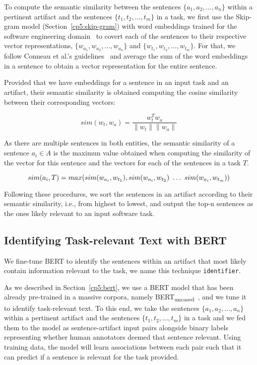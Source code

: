 To compute the semantic similarity between the sentences $\{a_1, a_2, \dots, a_n\}$ within a pertinent artifact and the sentences $\{t_1, t_2, \dots, t_m\}$ in a task,
we first
 use the Skip-gram model (Section~\ref{cp5:skip-gram}) with word embeddings trained for the software engineering domain~\cite{Efstathiou2018} to covert each of the sentences to their respective vector representations, $\{ w_{a_1}, w_{a_2}, \dots, w_{a_n}\}$ and $\{ w_{t_1}, w_{t_2}, \dots, w_{t_m}\}$. For that, we follow Conneau et al.'s guidelines~\cite{conneau2018} 
 and average the sum of the word embeddings in a sentence to obtain a vector representation for the entire sentence.

 
 Provided that we have embeddings for a sentence in an input task and an artifact, their semantic similarity is obtained computing the cosine similarity  between their corresponding vectors:


\begin{equation}
    sim(w_t,w_a) = \frac{w_t^Tw_a}{\|w_t\| \|w_a\|}
    \label{eq:word-sim}
\end{equation}
 
\smallskip
 As there are multiple sentences in both entities, the semantic similarity of a sentence $a_i \in A$ is the maximun value obtained when computing the similarity of the vector for this sentence and the vectors for each of the sentences in a task $T$.

 \begin{equation}
    sim(a_i, T) = max(sim(w_{a_i}, w_{t_1}), sim(w_{a_i}, w_{t_2}) ~\dots~ sim(w_{a_i}, w_{t_m})) \\
\end{equation}


Following these procedures, we sort the sentences in an artifact according to their semantic similarity, i.e., from highest to lowest, and output the top-n sentences as the ones likely relevant to an input software task.


\subsection{Identifying Task-relevant Text with BERT}




We fine-tune BERT to identify the sentences within an artifact that most likely contain information relevant to the task, we name this technique \texttt{identifier}.



As we described in Section~\ref{cp5:bert}, we use a BERT model that has been already pre-trained in a massive corpora, namely BERT\textsubscript{uncased}~\cite{Devlin2018Bert}, and we tune it to identify task-relevant text.
To this end, we take the sentences $\{a_1, a_2, \dots, a_n\}$ within a pertinent artifact and the sentences $\{t_1, t_2, \dots, t_m\}$ in a task and we fed them to the model as sentence-artifact input pairs 
alongside binary labels representing whether human annotators deemed that sentence relevant. 
Using training data, the model will learn associations between each pair such that it can predict if a sentence is relevant for the task provided. 


